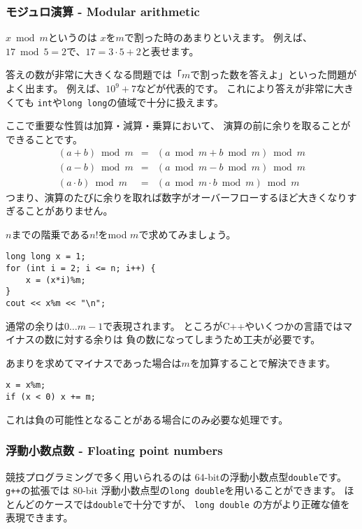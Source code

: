 \subsubsection{モジュロ演算 - Modular arithmetic}


$x \bmod m$というのは
$x$を$m$で割った時のあまりといえます。
例えば、$17 \bmod 5 = 2$で、$17 = 3 \cdot 5 + 2$と表せます。

答えの数が非常に大きくなる問題では「$m$で割った数を答えよ」といった問題がよく出ます。
例えば、$10^9+7$などが代表的です。
これにより答えが非常に大きくても
\texttt{int}や\texttt{long long}の値域で十分に扱えます。

ここで重要な性質は加算・減算・乗算において、
演算の前に余りを取ることができることです。
\[
\begin{array}{rcr}
(a+b) \bmod m & = & (a \bmod m + b \bmod m) \bmod m \\
(a-b) \bmod m & = & (a \bmod m - b \bmod m) \bmod m \\
(a \cdot b) \bmod m & = & (a \bmod m \cdot b \bmod m) \bmod m
\end{array}
\]
つまり、演算のたびに余りを取れば数字がオーバーフローするほど大きくなりすぎることがありません。

$n$までの階乗である$n!$をmod $m$で求めてみましょう。
\begin{lstlisting}
long long x = 1;
for (int i = 2; i <= n; i++) {
    x = (x*i)%m;
}
cout << x%m << "\n";
\end{lstlisting}

通常の余りは$0\ldots m-1$で表現されます。
ところがC++やいくつかの言語ではマイナスの数に対する余りは
負の数になってしまうため工夫が必要です。

あまりを求めてマイナスであった場合は$m$を加算することで解決できます。
\begin{lstlisting}
x = x%m;
if (x < 0) x += m;
\end{lstlisting}
これは負の可能性となることがある場合にのみ必要な処理です。

\subsubsection{浮動小数点数 - Floating point numbers}


競技プログラミングで多く用いられるのは
64-bitの浮動小数点型\texttt{double}です。
\texttt{g++}の拡張では
80-bit 浮動小数点型の\texttt{long double}を用いることができます。
ほとんどのケースでは\texttt{double}で十分ですが、
\texttt{long double} の方がより正確な値を表現できます。

